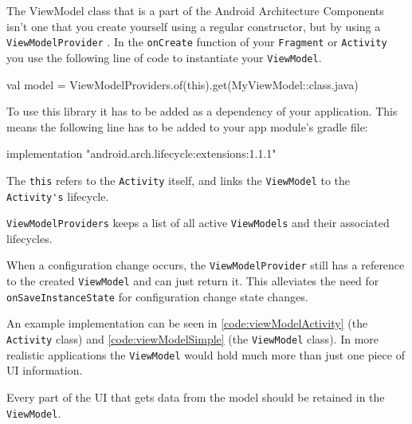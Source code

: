 The ViewModel class that is a part of the Android Architecture Components isn't one that you create yourself using a regular constructor, but by using a \lstinline!ViewModelProvider! \cite{viewModelProvider}.
In the \lstinline!onCreate! function of your \lstinline!Fragment! or \lstinline!Activity! you use the following line of code to instantiate your \lstinline!ViewModel!.


\begin{android}
	val model = ViewModelProviders.of(this).get(MyViewModel::class.java)	
\end{android}

To use this library it has to be added as a dependency of your application.
This means the following line has to be added to your app module's gradle file:

\begin{android}
	    implementation "android.arch.lifecycle:extensions:1.1.1"
\end{android}

The \lstinline!this! refers to the \lstinline!Activity! itself, and links the \lstinline!ViewModel! to the \lstinline!Activity's! lifecycle.

\lstinline!ViewModelProviders! keeps a list of all active \lstinline!ViewModels! and their associated lifecycles. 

When a configuration change occurs, the \lstinline!ViewModelProvider! still has a reference to the created \lstinline!ViewModel! and can just return it.
This alleviates the need for \lstinline!onSaveInstanceState! for configuration change state changes. 

An example implementation can be seen in \ref{code:viewModelActivity} (the \lstinline!Activity! class) and \ref{code:viewModelSimple} (the \lstinline!ViewModel! class).
In more realistic applications the \lstinline!ViewModel! would hold much more than just one piece of UI information.

Every part of the UI that gets data from the model should be retained in the \lstinline!ViewModel!.



